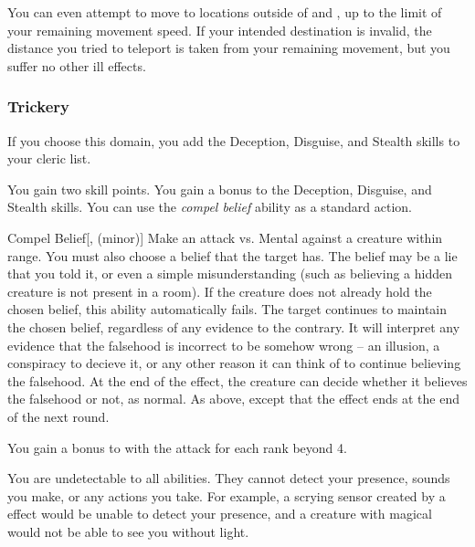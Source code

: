             You can even attempt to move to locations outside of  and , up to the limit of your remaining movement speed.
            If your intended destination is invalid, the distance you tried to teleport is taken from your remaining movement, but you suffer no other ill effects.

        \subsubsection{Trickery}
            If you choose this domain, you add the Deception, Disguise, and Stealth skills to your cleric  list.

             You gain two skill points.
             You gain a  bonus to the Deception, Disguise, and Stealth skills.
             You can use the \textit{compel belief} ability as a standard action.
            \begin{freeability}{Compel Belief}[,  (minor)]
                Make an attack vs. Mental against a creature within \rngmed range.
                You must also choose a belief that the target has.
                The belief may be a lie that you told it, or even a simple misunderstanding (such as believing a hidden creature is not present in a room).
                If the creature does not already hold the chosen belief, this ability automatically fails.
                \hit The target continues to maintain the chosen belief, regardless of any evidence to the contrary.
                It will interpret any evidence that the falsehood is incorrect to be somehow wrong -- an illusion, a conspiracy to decieve it, or any other reason it can think of to continue believing the falsehood.
                At the end of the effect, the creature can decide whether it believes the falsehood or not, as normal.
                \glance As above, except that the effect ends at the end of the next round.

                \rankline
                You gain a  bonus to  with the attack for each rank beyond 4.
            \end{freeability}
             You are undetectable to all  abilities.
            They cannot detect your presence, sounds you make, or any actions you take.
            For example, a scrying sensor created by a  effect would be unable to detect your presence, and a creature with magical  would not be able to see you without light.

